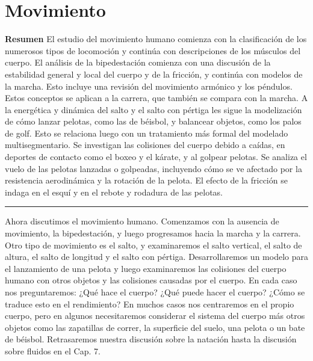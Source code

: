 \documentclass[12pt]{book}
\begin{document}
\setcounter{chapter}{2}

\chapter{Movimiento}

\noindent \textbf{Resumen} El estudio del movimiento humano comienza con la clasificación de los numerosos tipos de locomoción y continúa con descripciones de los músculos del cuerpo. El análisis de la bipedestación comienza con una discusión de la estabilidad general y local del cuerpo y de la fricción, y continúa con modelos de la marcha. Esto incluye una revisión del movimiento armónico y los péndulos. Estos conceptos se aplican a la carrera, que también se compara con la marcha. A la energética y dinámica del salto y el salto con pértiga les sigue la modelización de cómo lanzar pelotas, como las de béisbol, y balancear objetos, como los palos de golf. Esto se relaciona luego con un tratamiento más formal del modelado multisegmentario. Se investigan las colisiones del cuerpo debido a caídas, en deportes de contacto como el boxeo y el kárate, y al golpear pelotas. Se analiza el vuelo de las pelotas lanzadas o golpeadas, incluyendo cómo se ve afectado por la resistencia aerodinámica y la rotación de la pelota. El efecto de la fricción se indaga en el esquí y en el rebote y rodadura de las pelotas.

\hrule
\vspace{1em}

Ahora discutimos el movimiento humano. Comenzamos con la ausencia de movimiento, la bipedestación, y luego progresamos hacia la marcha y la carrera. Otro tipo de movimiento es el salto, y examinaremos el salto vertical, el salto de altura, el salto de longitud y el salto con pértiga. Desarrollaremos un modelo para el lanzamiento de una pelota y luego examinaremos las colisiones del cuerpo humano con otros objetos y las colisiones causadas por el cuerpo. En cada caso nos preguntaremos: ¿Qué hace el cuerpo? ¿Qué puede hacer el cuerpo? ¿Cómo se traduce esto en el rendimiento? En muchos casos nos centraremos en el propio cuerpo, pero en algunos necesitaremos considerar el sistema del cuerpo más otros objetos como las zapatillas de correr, la superficie del suelo, una pelota o un bate de béisbol. Retrasaremos nuestra discusión sobre la natación hasta la discusión sobre fluidos en el Cap. 7.
\end{document}
